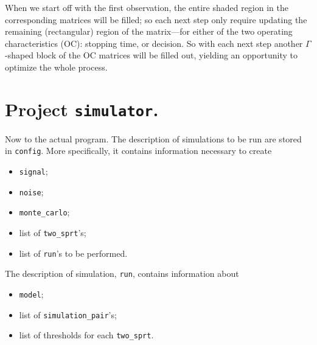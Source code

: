 \documentclass[12pt]{article}
\DeclareMathOperator{\Hyp}{\mathcal{H}}
\begin{document}
\begin{center}
\end{center}

When we start off with the first observation, the entire shaded region in the corresponding matrices will be filled; so each next step only require updating the remaining (rectangular) region of the matrix---for either of the two operating characteristics (OC): stopping time, or decision. So with each next step another $\Gamma $-shaped block of the OC matrices will be filled out, yielding an opportunity to optimize the whole process.

\newpage
\section*{Project \texttt{simulator}.}

Now to the actual program. The description of simulations to be run are stored in \texttt{config}.
More specifically, it contains information necessary to create
\begin{itemize}
    \item \texttt{signal};
    \item \texttt{noise};
    \item \texttt{monte\_carlo};
    \item list of \texttt{two\_sprt}'s;
    \item list of \texttt{run}'s to be performed.
\end{itemize}
%
The description of simulation, \texttt{run}, contains information about
\begin{itemize}
    \item \texttt{model};
    \item list of \texttt{simulation\_pair}'s;
    \item list of thresholds for each \texttt{two\_sprt}.
\end{itemize}
\end{document}
